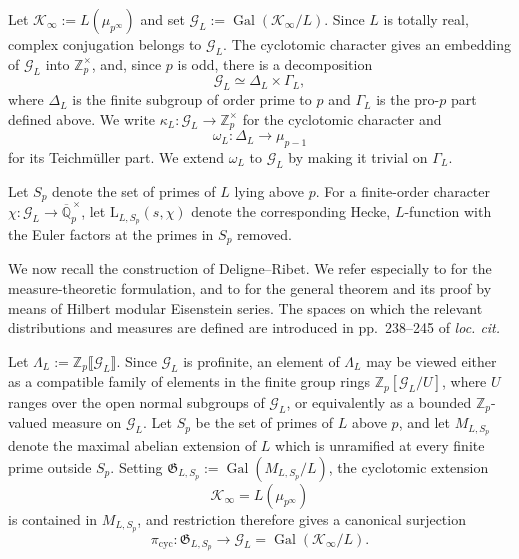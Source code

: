 \documentclass[11pt,table]{amsart}
\numberwithin{equation}{section}
\begin{document}
\par Let $\mathcal K_\infty
        :=
        L(\mu_{p^\infty})$ and set $\mathcal G_L
        :=
        \operatorname{Gal}(\mathcal K_\infty/L)$. Since \(L\) is totally real, complex conjugation belongs to
\(\mathcal G_L\).  The cyclotomic character gives an embedding of
\(\mathcal G_L\) into \(\mathbb Z_p^\times\), and, since \(p\) is odd,
there is a decomposition
\[
        \mathcal G_L
        \simeq
        \Delta_L\times\Gamma_L,
\]
where \(\Delta_L\) is the finite subgroup of order prime to \(p\) and
\(\Gamma_L\) is the pro-\(p\) part defined above.  We write $\kappa_L:
        \mathcal G_L
        \longrightarrow
        \mathbb Z_p^\times$ for the cyclotomic character and 
        \begin{equation}\label{omegaL}\omega_L:
        \Delta_L
        \longrightarrow
        \mu_{p-1}\end{equation} for its Teichm\"uller part.  We extend \(\omega_L\) to
\(\mathcal G_L\) by making it trivial on \(\Gamma_L\).
\par Let \(S_p\) denote the set of primes of \(L\) lying above \(p\).  For a
finite-order character $\chi:\mathcal G_L
        \longrightarrow
        \overline{\mathbb Q}_p^{\,\times}$,
let $\mathrm{L}_{L,S_p}(s,\chi)$ denote the corresponding Hecke, \(L\)-function
with the Euler factors at the primes in \(S_p\) removed.

\par We now recall the construction of Deligne--Ribet. We refer especially to
\cite[\S0, Theorems~(0.4) and~(0.5), pp.~231--232]{DeligneRibet}
for the measure-theoretic formulation, and to
\cite[\S8, Main Theorem~(8.2) and Theorem~(8.4),
pp.~278--283]{DeligneRibet}
for the general theorem and its proof by means of Hilbert modular
Eisenstein series. The spaces on which the relevant distributions and
measures are defined are introduced in pp.~238--245 of \emph{loc. cit.}
\par Let $\Lambda_L
        :=
        \mathbb Z_p\llbracket\mathcal G_L\rrbracket$. Since \(\mathcal G_L\) is profinite, an element of \(\Lambda_L\) may be
viewed either as a compatible family of elements in the finite group
rings $\mathbb Z_p[\mathcal G_L/U]$, where \(U\) ranges over the open normal subgroups of \(\mathcal G_L\),
or equivalently as a bounded \(\mathbb Z_p\)-valued measure on
\(\mathcal G_L\). Let \(S_p\) be the set of primes of \(L\) above
\(p\), and let \(M_{L,S_p}\) denote the maximal abelian extension of
\(L\) which is unramified at every finite prime outside \(S_p\). Setting $\mathfrak G_{L,S_p}
        :=
        \operatorname{Gal}(M_{L,S_p}/L)$, the cyclotomic extension
\[
        \mathcal K_\infty=L(\mu_{p^\infty})
\]
is contained in \(M_{L,S_p}\), and restriction therefore gives a
canonical surjection
\[
        \pi_{\mathrm{cyc}}:
        \mathfrak G_{L,S_p}
        \longrightarrow
        \mathcal G_L
        =
        \operatorname{Gal}(\mathcal K_\infty/L).
\]
\end{document}

